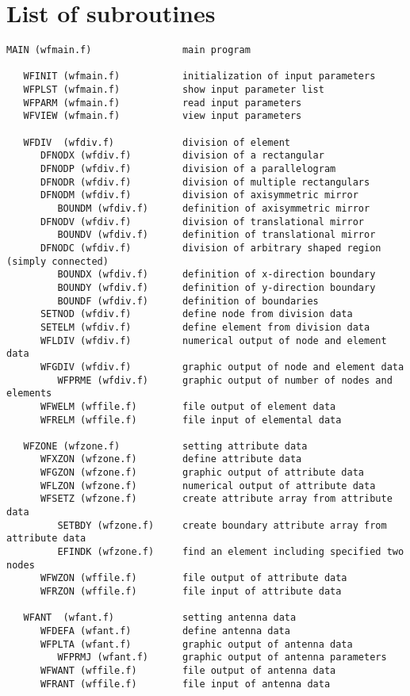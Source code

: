 \section{List of subroutines}

\begin{verbatim}
MAIN (wfmain.f)                main program

   WFINIT (wfmain.f)           initialization of input parameters
   WFPLST (wfmain.f)           show input parameter list
   WFPARM (wfmain.f)           read input parameters
   WFVIEW (wfmain.f)           view input parameters

   WFDIV  (wfdiv.f)            division of element
      DFNODX (wfdiv.f)         division of a rectangular
      DFNODP (wfdiv.f)         division of a parallelogram
      DFNODR (wfdiv.f)         division of multiple rectangulars
      DFNODM (wfdiv.f)         division of axisymmetric mirror
         BOUNDM (wfdiv.f)      definition of axisymmetric mirror
      DFNODV (wfdiv.f)         division of translational mirror
         BOUNDV (wfdiv.f)      definition of translational mirror
      DFNODC (wfdiv.f)         division of arbitrary shaped region (simply connected)
         BOUNDX (wfdiv.f)      definition of x-direction boundary
         BOUNDY (wfdiv.f)      definition of y-direction boundary
         BOUNDF (wfdiv.f)      definition of boundaries
      SETNOD (wfdiv.f)         define node from division data
      SETELM (wfdiv.f)         define element from division data
      WFLDIV (wfdiv.f)         numerical output of node and element data
      WFGDIV (wfdiv.f)         graphic output of node and element data
         WFPRME (wfdiv.f)      graphic output of number of nodes and elements
      WFWELM (wffile.f)        file output of element data
      WFRELM (wffile.f)        file input of elemental data

   WFZONE (wfzone.f)           setting attribute data
      WFXZON (wfzone.f)        define attribute data
      WFGZON (wfzone.f)        graphic output of attribute data
      WFLZON (wfzone.f)        numerical output of attribute data
      WFSETZ (wfzone.f)        create attribute array from attribute data
         SETBDY (wfzone.f)     create boundary attribute array from attribute data
         EFINDK (wfzone.f)     find an element including specified two nodes
      WFWZON (wffile.f)        file output of attribute data
      WFRZON (wffile.f)        file input of attribute data

   WFANT  (wfant.f)            setting antenna data
      WFDEFA (wfant.f)         define antenna data
      WFPLTA (wfant.f)         graphic output of antenna data
         WFPRMJ (wfant.f)      graphic output of antenna parameters
      WFWANT (wffile.f)        file output of antenna data
      WFRANT (wffile.f)        file input of antenna data


\end{verbatim}
